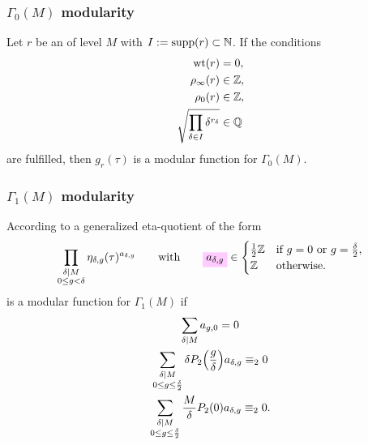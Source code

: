 \documentclass{article}
\begin{document}
\subsubsection{$\Gamma_0(M)$ modularity}

\begin{Lemma}\cite[Thm. 1.64]{Ono_WebOfModularity_2004}
  \label{thm:modular-eta-quotient-gamma0}
  Let $r$ be an  of level $M$
  with $I := \operatorname{supp}(r) \subset \mathbb{N}$. If the conditions
  \begin{align}
    \operatorname{wt}(r) &= 0, \label{eq:sum=0}\\
    \rho_\infty(r) &\in \mathbb{Z}, \label{eq:pure-rhoinfinity}\\
    \rho_0(r) &\in \mathbb{Z}, \label{eq:pure-rho0}\\
    \sqrt{\prod_{\delta\in I}\delta^{r_\delta}}&\in\mathbb{Q}\label{eq:productsquare}
  \end{align}
  are fulfilled, then $g_r(\tau)$ is a modular function for
  $\Gamma_0(M)$.
\end{Lemma}







\subsubsection{$\Gamma_1(M)$ modularity}

According to \cite[Thm.~3]{Robins_GeneralizedDedekindEtaProducts_1994}
a generalized eta-quotient of the form
\begin{gather}
  \prod_{\substack{\divides{\delta}{M}\\ 0\le g < \delta}}
  \eta_{\delta,g}(\tau)^{a_{\delta,g}}
  \qquad
  \text{with}
  \qquad
  \defineNotation[a-delta-g]{a_{\delta,g}}\in
  \begin{cases}
    \frac{1}{2}\setZ & \text{if $g=0$ or $g=\frac{\delta}{2}$},\\
    \setZ & \text{otherwise}.
  \end{cases}
  \label{eq:generalized-eta-quotient-a}
\end{gather}
is a modular function for $\Gamma_1(M)$ if
\begin{gather}
  \sum_{\delta \mid M} a_{g,0} = 0\\
  \sum_{\substack{\delta \mid M\\0 \le g \le \frac{\delta}{2}}}
  \delta P_2\Bigl(\frac{g}{\delta}\Bigr) a_{\delta,g} \equiv_2 0\\
  \sum_{\substack{\delta \mid M\\0 \le g \le \frac{\delta}{2}}}
  \frac{M}{\delta} P_2(0) a_{\delta,g} \equiv_2 0.
\end{gather}
\end{document}
